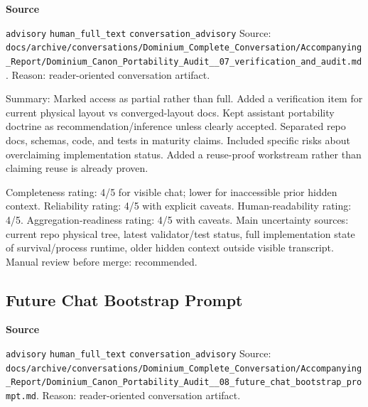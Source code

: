 \documentclass[9pt,a4paper,openany]{book}
\newcommand{\vonecallout}[3]{\par\medskip\noindent\begingroup\setlength{\fboxsep}{7pt}\colorbox{DomCalloutBg}{\parbox{0.94\linewidth}{\textbf{\textcolor{#1}{#2}}\par #3}}\endgroup\par\medskip}
\begin{document}
\vonecallout{DomSlate}{Source}{\texttt{advisory} \texttt{human\_\allowbreak{}full\_\allowbreak{}text} \texttt{conversation\_\allowbreak{}advisory} Source: \texttt{docs/\allowbreak{}archive/\allowbreak{}conversations/\allowbreak{}Dominium\_\allowbreak{}Complete\_\allowbreak{}Conversation/\allowbreak{}Accompanying\_\allowbreak{}Report/\allowbreak{}Dominium\_\allowbreak{}Canon\_\allowbreak{}Portability\_\allowbreak{}Audit\_\allowbreak{}\_\allowbreak{}07\_\allowbreak{}verification\_\allowbreak{}and\_\allowbreak{}audit.\allowbreak{}md}.\allowbreak{} Reason: reader-\allowbreak{}oriented conversation artifact.\allowbreak{}}

Summary: Marked access as partial rather than full.\allowbreak{} Added a verification item for current physical layout vs converged-\allowbreak{}layout docs.\allowbreak{} Kept assistant portability doctrine as recommendation/\allowbreak{}inference unless clearly accepted.\allowbreak{} Separated repo docs, schemas, code, and tests in maturity claims.\allowbreak{} Included specific risks about overclaiming implementation status.\allowbreak{} Added a reuse-\allowbreak{}proof workstream rather than claiming reuse is already proven.\allowbreak{}


Completeness rating: 4/\allowbreak{}5 for visible chat; lower for inaccessible prior hidden context.\allowbreak{} Reliability rating: 4/\allowbreak{}5 with explicit caveats.\allowbreak{} Human-\allowbreak{}readability rating: 4/\allowbreak{}5.\allowbreak{} Aggregation-\allowbreak{}readiness rating: 4/\allowbreak{}5 with caveats.\allowbreak{} Main uncertainty sources: current repo physical tree, latest validator/\allowbreak{}test status, full implementation state of survival/\allowbreak{}process runtime, older hidden context outside visible transcript.\allowbreak{} Manual review before merge: recommended.\allowbreak{}



\subsection{Future Chat Bootstrap Prompt}

\vonecallout{DomSlate}{Source}{\texttt{advisory} \texttt{human\_\allowbreak{}full\_\allowbreak{}text} \texttt{conversation\_\allowbreak{}advisory} Source: \texttt{docs/\allowbreak{}archive/\allowbreak{}conversations/\allowbreak{}Dominium\_\allowbreak{}Complete\_\allowbreak{}Conversation/\allowbreak{}Accompanying\_\allowbreak{}Report/\allowbreak{}Dominium\_\allowbreak{}Canon\_\allowbreak{}Portability\_\allowbreak{}Audit\_\allowbreak{}\_\allowbreak{}08\_\allowbreak{}future\_\allowbreak{}chat\_\allowbreak{}bootstrap\_\allowbreak{}prompt.\allowbreak{}md}.\allowbreak{} Reason: reader-\allowbreak{}oriented conversation artifact.\allowbreak{}}
\end{document}

